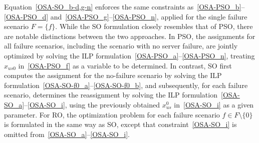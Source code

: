 \documentclass[10pt, letterpaper]{IEEEtran}
\begin{document}
\begin{CJK}{UTF8}{ipxm}
Equation~\eqref{OSA-SO_b-d,g-n} enforces the same constraints as~\eqref{OSA-PSO_b}--\eqref{OSA-PSO_d} and~\eqref{OSA-PSO_g}--\eqref{OSA-PSO_n}, applied for the single failure scenario $F = \{f\}$.
While the SO formulation closely resembles that of PSO, there are notable distinctions between the two approaches.
In PSO, the assignments for all failure scenarios, including the scenario with no server failure, are jointly optimized by solving the ILP formulation~\eqref{OSA-PSO_a}--\eqref{OSA-PSO_n}, treating $x_{us0}$ in~\eqref{OSA-PSO_f} as a variable to be determined.
In contrast, SO first computes the assignment for the no-failure scenario by solving the ILP formulation~\eqref{OSA-SO-f0_a}--\eqref{OSA-SO-f0_b}, and subsequently, for each failure scenario, determines the reassignment by solving the ILP formulation~\eqref{OSA-SO_a}--\eqref{OSA-SO_i}, using the previously obtained $x^0_{us}$ in~\eqref{OSA-SO_i} as a given parameter.
For RO, the optimization problem for each failure scenario $f \in F \setminus \{0\}$ is formulated in the same way as SO, except that constraint~\eqref{OSA-SO_i} is omitted from~\eqref{OSA-SO_a}--\eqref{OSA-SO_i}.


\end{CJK}
\end{document}
